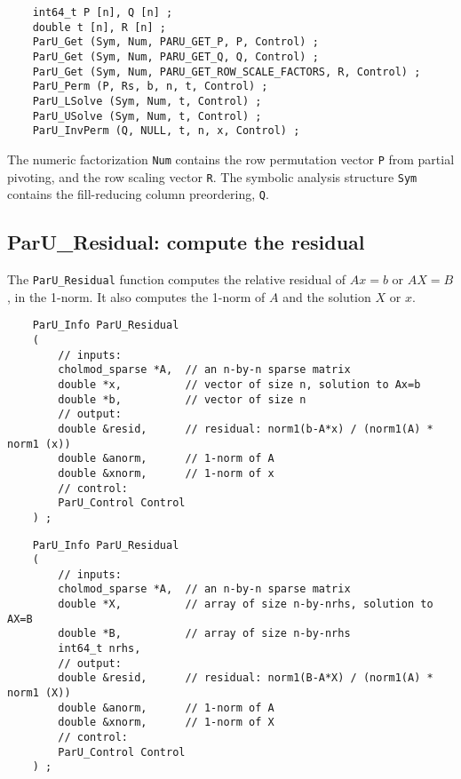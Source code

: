 \documentclass[12pt]{article}
\begin{document}
    {\footnotesize
    \begin{verbatim}
    int64_t P [n], Q [n] ;
    double t [n], R [n] ;
    ParU_Get (Sym, Num, PARU_GET_P, P, Control) ;
    ParU_Get (Sym, Num, PARU_GET_Q, Q, Control) ;
    ParU_Get (Sym, Num, PARU_GET_ROW_SCALE_FACTORS, R, Control) ;
    ParU_Perm (P, Rs, b, n, t, Control) ;
    ParU_LSolve (Sym, Num, t, Control) ;
    ParU_USolve (Sym, Num, t, Control) ;
    ParU_InvPerm (Q, NULL, t, n, x, Control) ; \end{verbatim} }

    The numeric factorization \verb'Num' contains the row permutation vector
    \verb'P' from partial pivoting, and the row scaling vector
    \verb'R'.  The symbolic analysis structure \verb'Sym' contains the
    fill-reducing column preordering, \verb'Q'.

\subsection{{\sf ParU\_Residual}: compute the residual}

    The \verb'ParU_Residual' function computes the relative residual of
    $Ax=b$ or $AX=B$, in the 1-norm.  It also computes the 1-norm of $A$
    and the solution $X$ or $x$.

    {\footnotesize
    \begin{verbatim}
    ParU_Info ParU_Residual
    (
        // inputs:
        cholmod_sparse *A,  // an n-by-n sparse matrix
        double *x,          // vector of size n, solution to Ax=b
        double *b,          // vector of size n
        // output:
        double &resid,      // residual: norm1(b-A*x) / (norm1(A) * norm1 (x))
        double &anorm,      // 1-norm of A
        double &xnorm,      // 1-norm of x
        // control:
        ParU_Control Control
    ) ; \end{verbatim} }

    {\footnotesize
    \begin{verbatim}
    ParU_Info ParU_Residual
    (
        // inputs:
        cholmod_sparse *A,  // an n-by-n sparse matrix
        double *X,          // array of size n-by-nrhs, solution to AX=B
        double *B,          // array of size n-by-nrhs
        int64_t nrhs,
        // output:
        double &resid,      // residual: norm1(B-A*X) / (norm1(A) * norm1 (X))
        double &anorm,      // 1-norm of A
        double &xnorm,      // 1-norm of X
        // control:
        ParU_Control Control
    ) ; \end{verbatim} }
\end{document}

